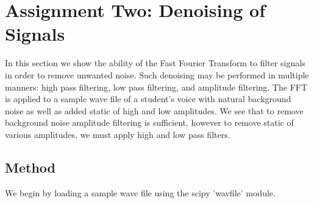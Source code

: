 
\section{Assignment Two: Denoising of Signals} %
\label{sec:assignment_two_denoising_of_signals}

In this section we show the ability of the Fast Fourier Transform to filter signals in order to remove unwanted noise. Such denoising may be performed in multiple manners: high pass filtering, low pass filtering, and amplitude filtering. The FFT is applied to a sample wave file of a student's voice with natural background noise as well as added static of high and low amplitudes. We see that to remove background noise amplitude filtering is sufficient, however to remove static of various amplitudes, we must apply high and low pass filters.

\subsection{Method} %
\label{sub:method}
We begin by loading a sample wave file using the scipy 'wavfile' module.


